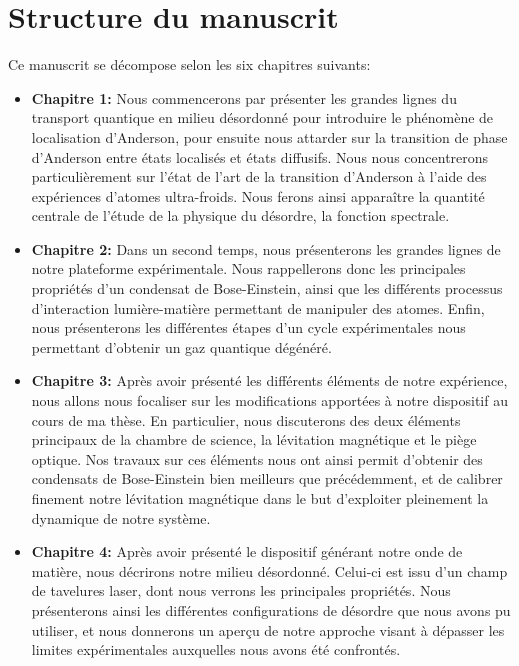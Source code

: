 \section{Structure du manuscrit}
Ce manuscrit se décompose selon les six chapitres suivants:
\begin{itemize}
\item[\textendash] \textbf{Chapitre 1:} Nous commencerons par présenter les grandes lignes du transport quantique en milieu désordonné pour introduire le phénomène de localisation d'Anderson, pour ensuite nous attarder sur la transition de phase d'Anderson entre états localisés et états diffusifs. Nous nous concentrerons particulièrement sur l'état de l'art de la transition d'Anderson à l'aide des expériences d'atomes ultra-froids.  Nous ferons ainsi apparaître la quantité centrale de l'étude de la physique du désordre, la fonction spectrale. \\

\item[\textendash] \textbf{Chapitre 2:} Dans un second temps, nous présenterons les grandes lignes de notre plateforme expérimentale. Nous rappellerons donc les principales propriétés d'un condensat de Bose-Einstein, ainsi que les différents processus d'interaction lumière-matière permettant de manipuler des atomes. Enfin, nous présenterons les différentes étapes d'un cycle expérimentales nous permettant d'obtenir un gaz quantique dégénéré. \\

\item[\textendash] \textbf{Chapitre 3:} Après avoir présenté les différents éléments de notre expérience, nous allons nous focaliser sur les modifications apportées à notre dispositif au cours de ma thèse. En particulier, nous discuterons des deux éléments principaux de la chambre de science, la lévitation magnétique et le piège optique. Nos travaux sur ces éléments nous ont ainsi permit d'obtenir des condensats de Bose-Einstein bien meilleurs que précédemment, et de calibrer finement notre lévitation magnétique dans le but d'exploiter pleinement la dynamique de notre système. \\

\item[\textendash] \textbf{Chapitre 4:} Après avoir présenté le dispositif générant notre onde de matière, nous décrirons notre milieu désordonné. Celui-ci est issu d'un champ de tavelures laser, dont nous verrons les principales propriétés. Nous présenterons ainsi les différentes configurations de désordre que nous avons pu utiliser, et nous donnerons un aperçu de notre approche visant à dépasser les limites expérimentales auxquelles nous avons été confrontés. \\


\end{itemize}
